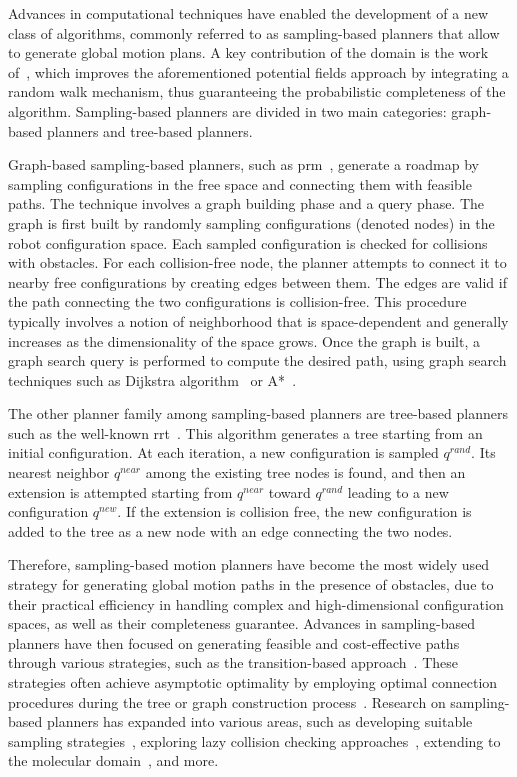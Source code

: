 Advances in computational techniques have enabled the development of a new class of algorithms, commonly referred to as sampling-based planners that allow to generate global motion plans.
A key contribution of the domain is the work of~\cite{cLatombe}, which improves the aforementioned potential fields approach by integrating a random walk mechanism, thus guaranteeing the probabilistic completeness of the algorithm.
Sampling-based planners are divided in two main categories: graph-based planners and tree-based planners.

Graph-based sampling-based planners, such as \gls{prm}~\cite{cPRM}, generate a roadmap by sampling configurations in the free space and connecting them with feasible paths. 
The technique involves a graph building phase and a query phase.
The graph is first built by randomly sampling configurations (denoted nodes) in the robot configuration space.
Each sampled configuration is checked for collisions with obstacles.
For each collision-free node, the planner attempts to connect it to nearby free configurations by creating edges between them.  
The edges are valid if the path connecting the two configurations is collision-free.
This procedure typically involves a notion of neighborhood that is space-dependent and generally increases as the dimensionality of the space grows.
Once the graph is built, a graph search query is performed to compute the desired path, using graph search techniques such as Dijkstra algorithm~\cite{cDijk} or A*~\cite{cA*}.

The other planner family among sampling-based planners are tree-based planners such as the well-known \gls{rrt}~\cite{cRRT}.
This algorithm generates a tree starting from an initial configuration.
At each iteration, a new configuration is sampled $q^{rand}$.
Its nearest neighbor $q^{near}$ among the existing tree nodes is found, and then an extension is attempted starting from $q^{near}$ toward $q^{rand}$ leading to a new configuration $q^{new}$.
If the extension is collision free, the new configuration is added to the tree as a new node with an edge connecting the two nodes.

Therefore, sampling-based motion planners have become the most widely used strategy for generating global motion paths in the presence of obstacles, due to their practical efficiency in handling complex and high-dimensional configuration spaces, as well as their completeness guarantee.
Advances in sampling-based planners have then focused on generating feasible and cost-effective paths through various strategies, such as the transition-based approach~\cite{cTRRT}. 
These strategies often achieve asymptotic optimality by employing optimal connection procedures during the tree or graph construction process~\cite{cRRTstar, cTRRTstar, cFMT}.
Research on sampling-based planners has expanded into various areas, such as developing suitable sampling strategies~\cite{cSampling}, exploring lazy collision checking approaches~\cite{cLazy1}, extending to the molecular domain~\cite{cMolecular}, and more.

